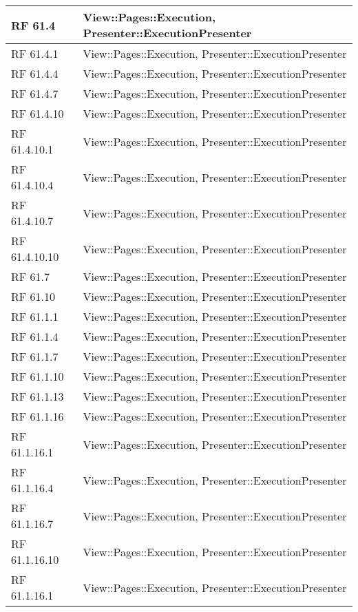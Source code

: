 {\begin{longtable} [c]{| p{2cm} | p{13cm} |}
 \hline 
RF 61.4 & View::Pages::Execution, Presenter::ExecutionPresenter\\ 
 \hline 
RF 61.4.1 & View::Pages::Execution, Presenter::ExecutionPresenter\\ 
 \hline 
RF 61.4.4 & View::Pages::Execution, Presenter::ExecutionPresenter\\ 
 \hline 
RF 61.4.7 & View::Pages::Execution, Presenter::ExecutionPresenter\\ 
 \hline 
RF 61.4.10 & View::Pages::Execution, Presenter::ExecutionPresenter\\ 
 \hline 
RF 61.4.10.1 & View::Pages::Execution, Presenter::ExecutionPresenter\\ 
 \hline 
RF 61.4.10.4 & View::Pages::Execution, Presenter::ExecutionPresenter\\ 
 \hline 
RF 61.4.10.7 & View::Pages::Execution, Presenter::ExecutionPresenter\\ 
 \hline 
RF 61.4.10.10 & View::Pages::Execution, Presenter::ExecutionPresenter\\ 
 \hline 
RF 61.7 & View::Pages::Execution, Presenter::ExecutionPresenter\\ 
 \hline 
RF 61.10 & View::Pages::Execution, Presenter::ExecutionPresenter\\ 
 \hline 
RF 61.1.1 & View::Pages::Execution, Presenter::ExecutionPresenter\\ 
 \hline 
RF 61.1.4 & View::Pages::Execution, Presenter::ExecutionPresenter\\ 
 \hline 
RF 61.1.7 & View::Pages::Execution, Presenter::ExecutionPresenter\\ 
 \hline 
RF 61.1.10 & View::Pages::Execution, Presenter::ExecutionPresenter\\ 
 \hline 
RF 61.1.13 & View::Pages::Execution, Presenter::ExecutionPresenter\\ 
 \hline 
RF 61.1.16 & View::Pages::Execution, Presenter::ExecutionPresenter\\ 
 \hline 
RF 61.1.16.1 & View::Pages::Execution, Presenter::ExecutionPresenter\\ 
 \hline 
RF 61.1.16.4 & View::Pages::Execution, Presenter::ExecutionPresenter\\ 
 \hline 
RF 61.1.16.7 & View::Pages::Execution, Presenter::ExecutionPresenter\\ 
 \hline 
RF 61.1.16.10 & View::Pages::Execution, Presenter::ExecutionPresenter\\ 
 \hline 
RF 61.1.16.1 & View::Pages::Execution, Presenter::ExecutionPresenter\\ 

\end{longtable}}

